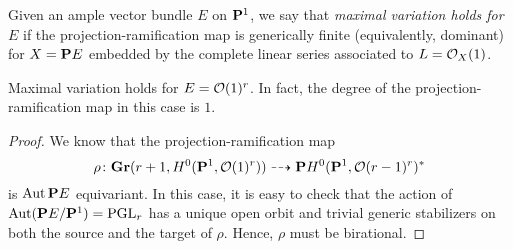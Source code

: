 Given an ample vector bundle $E$ on $\P^1$, we say that \emph{maximal variation holds for $E$} if the projection-ramification map is generically finite (equivalently, dominant) for $X = \P E$ embedded by the complete linear series associated to $L = \O_X(1)$.

\begin{proposition}\label{prop:segre}
  Maximal variation holds for $E = \O(1)^r$.
  In fact, the degree of the projection-ramification map in this case is $1$.
\end{proposition}
\begin{proof}
  We know that the projection-ramification map
  \[ \rho \from \Gr(r+1, H^0(\P^1, \O(1)^r)) \dashrightarrow \P H^0(\P^1, \O(r-1)^r)^*\]
  is $\Aut \P E$ equivariant.
  In this case, it is easy to check that the action of $\Aut (\P E / \P^1) = \PGL_r$ has a unique open orbit and trivial generic stabilizers on both the source and the target of $\rho$.
  Hence, $\rho$ must be birational.  
\end{proof}


